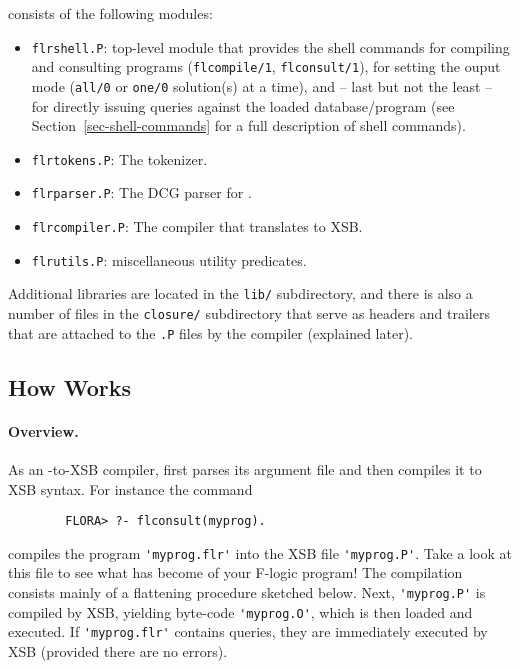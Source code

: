 \documentclass[11pt]{report}
\begin{document}
\FLORA consists of the following modules:
\begin{itemize}
\item \texttt{flrshell.P}: top-level module that provides the \FLORA shell
  commands for compiling and consulting \FLORA programs
  (\texttt{flcompile/1}, \texttt{flconsult/1}), for setting the ouput mode
  (\texttt{all/0} or \texttt{one/0} solution(s) at a time), and -- last but
  not the least -- for directly issuing queries against the loaded
  database/program (see Section~\ref{sec-shell-commands} for a full
  description of shell commands).
\item \texttt{flrtokens.P}: The \FLORA tokenizer.
\item \texttt{flrparser.P}: The DCG parser for \fl.
\item \texttt{flrcompiler.P}: The \FLORA compiler that translates \fl to XSB.
\item \texttt{flrutils.P}: miscellaneous utility predicates.
\end{itemize}
Additional libraries are located in the {\tt lib/} subdirectory, and there
is also a number of files in the {\tt closure/} subdirectory that serve as
headers and trailers that are attached to the {\tt *.P} files by the
compiler (explained later).



\subsection{How \FLORA Works}



\paragraph{Overview.}

As an \fl-to-XSB compiler, \FLORA first parses its argument file and then
compiles it to XSB syntax. For instance the command
\begin{verbatim}
        FLORA> ?- flconsult(myprog).
\end{verbatim}
compiles the program \verb|'myprog.flr'| into the XSB file
\verb|'myprog.P'|.  Take a look at this file to see what has become of your
F-logic program! The compilation consists mainly of a flattening procedure
sketched below.  Next, \verb|'myprog.P'| is compiled by XSB, yielding
byte-code \verb|'myprog.O'|, which is then loaded and executed.  If
\verb|'myprog.flr'| contains queries, they are immediately executed by XSB
(provided there are no errors).
\end{document}
